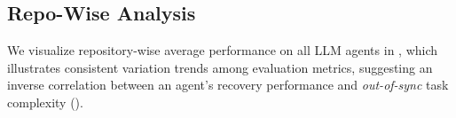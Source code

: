 \subsection{Repo-Wise Analysis}
\label{Appendix:C.7 (repo-wise comparison)}

We visualize repository-wise average performance on all LLM agents in , which illustrates consistent variation trends among evaluation metrics, suggesting an inverse correlation between an agent's recovery performance and \textit{out-of-sync} task complexity ().












    
        

